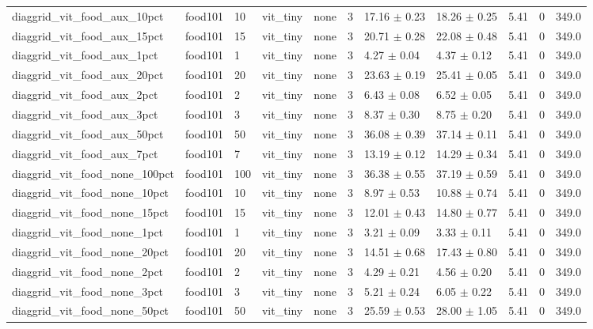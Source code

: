 \begin{tabular}{lllllllllll}
diaggrid_vit_food_aux_10pct & food101 & 10 & vit_tiny & none & 3 & 17.16 $\pm$ 0.23 & 18.26 $\pm$ 0.25 & 5.41 & 0 & 349.0 \\
diaggrid_vit_food_aux_15pct & food101 & 15 & vit_tiny & none & 3 & 20.71 $\pm$ 0.28 & 22.08 $\pm$ 0.48 & 5.41 & 0 & 349.0 \\
diaggrid_vit_food_aux_1pct & food101 & 1 & vit_tiny & none & 3 & 4.27 $\pm$ 0.04 & 4.37 $\pm$ 0.12 & 5.41 & 0 & 349.0 \\
diaggrid_vit_food_aux_20pct & food101 & 20 & vit_tiny & none & 3 & 23.63 $\pm$ 0.19 & 25.41 $\pm$ 0.05 & 5.41 & 0 & 349.0 \\
diaggrid_vit_food_aux_2pct & food101 & 2 & vit_tiny & none & 3 & 6.43 $\pm$ 0.08 & 6.52 $\pm$ 0.05 & 5.41 & 0 & 349.0 \\
diaggrid_vit_food_aux_3pct & food101 & 3 & vit_tiny & none & 3 & 8.37 $\pm$ 0.30 & 8.75 $\pm$ 0.20 & 5.41 & 0 & 349.0 \\
diaggrid_vit_food_aux_50pct & food101 & 50 & vit_tiny & none & 3 & 36.08 $\pm$ 0.39 & 37.14 $\pm$ 0.11 & 5.41 & 0 & 349.0 \\
diaggrid_vit_food_aux_7pct & food101 & 7 & vit_tiny & none & 3 & 13.19 $\pm$ 0.12 & 14.29 $\pm$ 0.34 & 5.41 & 0 & 349.0 \\
diaggrid_vit_food_none_100pct & food101 & 100 & vit_tiny & none & 3 & 36.38 $\pm$ 0.55 & 37.19 $\pm$ 0.59 & 5.41 & 0 & 349.0 \\
diaggrid_vit_food_none_10pct & food101 & 10 & vit_tiny & none & 3 & 8.97 $\pm$ 0.53 & 10.88 $\pm$ 0.74 & 5.41 & 0 & 349.0 \\
diaggrid_vit_food_none_15pct & food101 & 15 & vit_tiny & none & 3 & 12.01 $\pm$ 0.43 & 14.80 $\pm$ 0.77 & 5.41 & 0 & 349.0 \\
diaggrid_vit_food_none_1pct & food101 & 1 & vit_tiny & none & 3 & 3.21 $\pm$ 0.09 & 3.33 $\pm$ 0.11 & 5.41 & 0 & 349.0 \\
diaggrid_vit_food_none_20pct & food101 & 20 & vit_tiny & none & 3 & 14.51 $\pm$ 0.68 & 17.43 $\pm$ 0.80 & 5.41 & 0 & 349.0 \\
diaggrid_vit_food_none_2pct & food101 & 2 & vit_tiny & none & 3 & 4.29 $\pm$ 0.21 & 4.56 $\pm$ 0.20 & 5.41 & 0 & 349.0 \\
diaggrid_vit_food_none_3pct & food101 & 3 & vit_tiny & none & 3 & 5.21 $\pm$ 0.24 & 6.05 $\pm$ 0.22 & 5.41 & 0 & 349.0 \\
diaggrid_vit_food_none_50pct & food101 & 50 & vit_tiny & none & 3 & 25.59 $\pm$ 0.53 & 28.00 $\pm$ 1.05 & 5.41 & 0 & 349.0 \\

\end{tabular}
